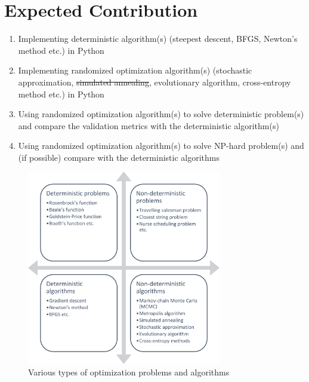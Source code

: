 \documentclass[conference]{IEEEtran}
\begin{document}
\section{Expected Contribution}

\begin{enumerate}
	\item{Implementing deterministic algorithm(s) (steepest descent, BFGS, Newton's method etc.) in Python}
	\item{Implementing randomized optimization algorithm(s) (stochastic approximation, \sout{simulated annealing}, evolutionary algorithm, cross-entropy method etc.) in Python}
	\item{Using randomized optimization algorithm(s) to solve deterministic problem(s) and compare the validation metrics with the deterministic algorithm(s)}
	\item{Using randomized optimization algorithm(s) to solve NP-hard problem(s) and (if possible) compare with the deterministic algorithms}
\end{enumerate}


\begin{figure}[htbp]
\centerline{\includegraphics[width=85mm]{flowchart.png}}
\caption{Various types of optimization problems and algorithms}
\label{fig}
\end{figure}
\end{document}
